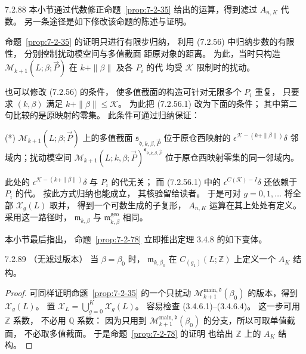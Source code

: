 \begin{remark}{7.2.88}\label{rem:7-2-88}
本小节通过代数修正命题~\ref{prop:7-2-35}
给出的运算，得到滤过 $A_{n,K}$ 代数。
另一条途径是如下修改该命题的陈述与证明。

命题~\ref{prop:7-2-35}
的证明只进行有限步归纳，
利用 (7.2.56) 中归纳步数的有限性，
分别控制扰动模空间与多值截面
距原对象的距离。
为此，当时只构造
$\mathcal M_{k+1}(L;\beta;\vec P)$
在 $k+\|\beta\|$ 及各 $P_i$ 的代
均受 $\mathcal K$ 限制时的扰动。

也可以修改 (7.2.56) 的条件，
使多值截面的构造可针对无限多个 $P_i$ 重复，
只要求 $(k,\beta)$ 满足
$k+\|\beta\|\le\mathcal K$。
为此把 (7.2.56.1) 改为下面的条件；
其中第二句比较的是原映射的零集。%
此条件可通过归纳保证：

\noindent\textup{(*)}\quad
$\mathcal M_{k+1}(L;\beta;\vec P)$
上的多值截面
$\mathfrak s_{\mathfrak d,k,\beta,\vec P}$
位于原仓西映射的
$\epsilon^{\mathcal K-(k+\|\beta\|)}\delta$
邻域内；扰动模空间
$\mathcal M_{k+1}(L;k,\beta;\vec P)
^{\mathfrak s_{\mathfrak d,k,\beta,\vec P}}$
位于原仓西映射零集的同一邻域内。

此处的
$\epsilon^{\mathcal K-(k+\|\beta\|)}\delta$
与 $P_i$ 的代无关；
而 (7.2.56.1) 中的
$\epsilon^{C(\mathcal K)-I}\delta$
还依赖于 $P_i$ 的代。
按此方式归纳也能成立，
其核验留给读者。
于是可对 $g=0,1,\ldots$
将全部 $\mathcal X_g(L)$ 取并，
得到一个可数生成的子复形，
$A_{n,K}$ 运算在其上处处有定义。
采用这一路径时，
$\mathfrak m_{k,\beta}$
与 $\mathfrak m^{\mathrm{geo}}_{k,\beta}$ 相同。
\end{remark}

本小节最后指出，
命题~\ref{prop:7-2-78}
立即推出定理 3.4.8 的如下变体。
\begin{corollary}{7.2.89}\label{cor:7-2-89}
\textup{（无滤过版本）}
当 $\beta=\beta_0$ 时，
$\mathfrak m_{k,\beta_0}$
在 $C_{(g_1)}(L;\mathbb Z)$ 上定义一个
$A_K$ 结构。
\end{corollary}
\begin{proof}
可同样证明命题~\ref{prop:7-2-35}
的一个只扰动
$\mathcal M^{\mathrm{main},\mathfrak d}_{k+1}(\beta_0)$
的版本，得到 $\mathcal X_g(L)$。
置
$\mathcal X_L=\bigcup_{g=0}^{K}\mathcal X_g(L)$。
容易检查 (3.4.6.1)--(3.4.6.4)。
这一步可用 $\mathbb Z$ 系数，
不必用 $\mathbb Q$ 系数：
因为只用到
$\mathcal M^{\mathrm{main},\mathfrak d}_{k+1}(\beta_0)$
的分支，所以可取单值截面，
不必取多值截面。
于是命题~\ref{prop:7-2-78} 的证明
也给出 $\mathbb Z$ 上的 $A_K$ 结构。
\end{proof}

